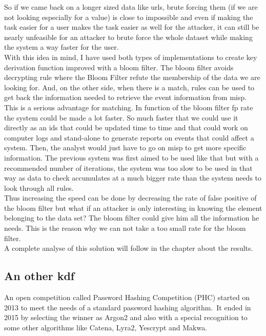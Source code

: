 \documentclass{eplmastersthesis}
\begin{document}
So if we came back on a longer sized data like \gls{url}s, brute forcing them (if we are not looking especially for a value) is close to impossible and even if making the task easier for a user makes the task easier as well for the attacker, it can still be nearly unfeasible for an attacker to brute force the whole dataset while making the system a way faster for the user.\\

With this idea in mind, I have used both types of implementations to create key derivation function improved with a bloom filter. The bloom filter avoids decrypting rule where the Bloom Filter refute the membership of the data we are looking for. 
And, on the other side, when there is a match, rules can be used to get back the information needed to retrieve the event information from \gls{misp}.\\

This is a serious advantage for matching. In function of the bloom filter \gls{fp} rate the system could be made a lot faster. So much faster that we could use it directly as an \gls{ids} that could be updated time to time and that could work on computer logs and  stand-alone to generate reports on events that could affect a system. Then, the analyst would just have to go on \gls{misp} to get more specific information.
The previous system was first aimed to be used like that but with a recommended number of iterations, the system was too slow to be used in that way as data to check accumulates at a much bigger rate than the system needs to look through all rules.\\

Thus increasing the speed can be done by decreasing the rate of false positive of the bloom filter but what if an attacker is only interesting in knowing the element belonging to the data set?
The bloom filter could give him all the information he needs. This is the reason why we can not take a too small rate for the bloom filter.\\

A complete analyse of this solution will follow in the chapter about the results.


\subsection{An other \gls{kdf}}
An open competition called Password Hashing Competition (PHC) started on 2013 to meet the needs of a standard password hashing algorithm.\
It ended in 2015 by selecting the winner as Argon2 and also with a special recognition to some other algorithms like Catena, Lyra2, Yescrypt and Makwa.\\
\end{document}
